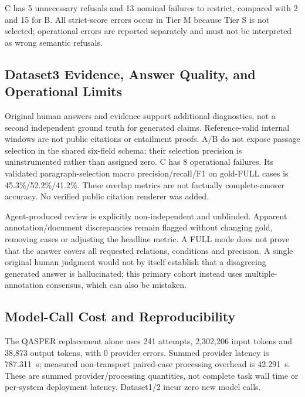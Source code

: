 C has 5 unnecessary refusals and 13 nominal failures to restrict, compared with 2 and 15 for B. All strict-score errors occur in Tier M because Tier S is not selected; operational errors are reported separately and must not be interpreted as wrong semantic refusals.

\subsection{Dataset3 Evidence, Answer Quality, and Operational Limits}

Original human answers and evidence support additional diagnostics, not a second independent ground truth for generated claims. Reference-valid internal windows are not public citations or entailment proofs. A/B do not expose passage selection in the shared six-field schema; their selection precision is uninstrumented rather than assigned zero. C has 8 operational failures. Its validated paragraph-selection macro precision/recall/F1 on gold-FULL cases is 45.3\%/52.2\%/41.2\%. These overlap metrics are not factually complete-answer accuracy. No verified public citation renderer was added.

Agent-produced review is explicitly non-independent and unblinded. Apparent annotation/document discrepancies remain flagged without changing gold, removing cases or adjusting the headline metric. A FULL mode does not prove that the answer covers all requested relations, conditions and precision. A single original human judgment would not by itself establish that a disagreeing generated answer is hallucinated; this primary cohort instead uses multiple-annotation consensus, which can also be mistaken.

\subsection{Model-Call Cost and Reproducibility}

The QASPER replacement alone uses 241 attempts, 2,302,206 input tokens and 38,873 output tokens, with 0 provider errors. Summed provider latency is 787.311~s; measured non-transport paired-case processing overhead is 42.291~s. These are summed provider/processing quantities, not complete task wall time or per-system deployment latency. Dataset1/2 incur zero new model calls.

